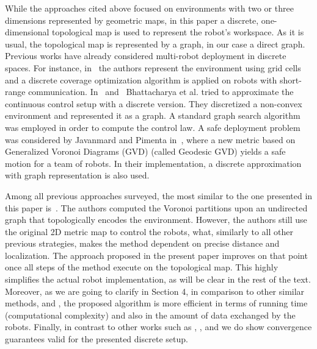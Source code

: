 \documentclass[smallcondensed]{svjour3}
\begin{document}
While the approaches cited above focused on environments with two or three dimensions represented by geometric maps, in this paper a discrete, one-dimensional topological map is used to represent the robot's workspace. As it is usual, the topological map is represented by a graph, in our case a direct graph.
% 
Previous works have already considered multi-robot deployment in discrete spaces. For instance, in~\cite{Durham2012} the authors represent the environment using grid cells and a discrete coverage optimization algorithm is applied on robots with short-range communication.
% 
In~\cite{Bhattacharya2013a} and~\cite{Bhattacharya2013IJRR} Bhattacharya et al. tried to approximate the continuous control setup with a discrete version. They discretized a non-convex environment and represented it as a graph. A standard graph search algorithm was employed in order to compute the control law.
%
A safe deployment problem was considered by Javanmard  and Pimenta in~\cite{reza2014}, where a new metric based on Generalized Voronoi Diagrams (GVD) (\sloppy called Geodesic GVD) yields a safe motion for a team of robots. In their implementation, a discrete approximation with graph representation is also used. 

Among all previous approaches surveyed, the most similar to the one presented in this paper is~\cite{Yun2013}. The authors computed the Voronoi partitions upon an undirected graph that topologically encodes the environment. However, the authors still use the original 2D metric map to control the robots, what, similarly to all other previous strategies, makes the method dependent on precise distance and localization. The approach proposed in the present paper improves on that point once all steps of the method execute on the topological map. This highly simplifies the actual robot implementation, as will be clear in the rest of the text. 
%
Moreover, as we are going to clarify in Section 4, in comparison to other similar methods, \cite{Yun2013} and \cite{Durham2012}, the proposed algorithm is more efficient in terms of running time (computational complexity) and also in the amount of data exchanged by the robots.
Finally, in contrast to other works such as \cite{Bhattacharya2013a}, \cite{Bhattacharya2013IJRR}, and \cite{reza2014} we do show convergence guarantees valid for the presented discrete setup.
\end{document}

